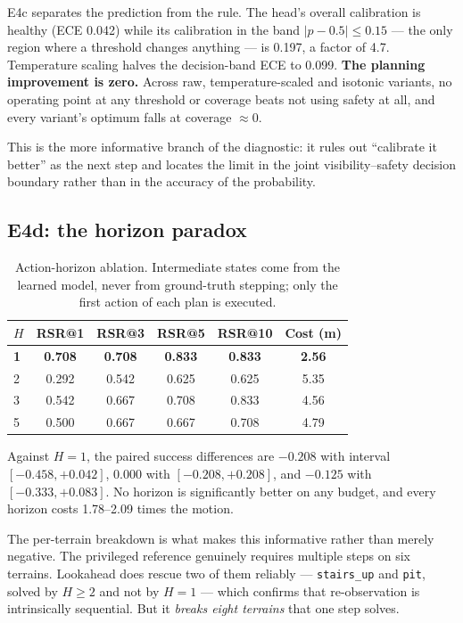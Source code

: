 \documentclass[utf8]{FrontiersinHarvard}
\begin{document}
E4c separates the prediction from the rule. The head's overall calibration is healthy
(ECE 0.042) while its calibration in the band $|p-0.5| \le 0.15$ --- the only region
where a threshold changes anything --- is 0.197, a factor of 4.7. Temperature scaling
halves the decision-band ECE to 0.099. \textbf{The planning improvement is zero.} Across
raw, temperature-scaled and isotonic variants, no operating point at any threshold or
coverage beats not using safety at all, and every variant's optimum falls at coverage
$\approx 0$.

This is the more informative branch of the diagnostic: it rules out ``calibrate it
better'' as the next step and locates the limit in the joint visibility--safety decision
boundary rather than in the accuracy of the probability.

\subsection{E4d: the horizon paradox}

\begin{table}[h]
\caption{Action-horizon ablation. Intermediate states come from the learned model, never
from ground-truth stepping; only the first action of each plan is executed.}
\label{tab:horizon}
\begin{tabular}{lccccc}
\toprule
$H$ & RSR@1 & RSR@3 & RSR@5 & RSR@10 & Cost (m) \\
\midrule
\textbf{1} & \textbf{0.708} & \textbf{0.708} & \textbf{0.833} & \textbf{0.833} & \textbf{2.56} \\
2 & 0.292 & 0.542 & 0.625 & 0.625 & 5.35 \\
3 & 0.542 & 0.667 & 0.708 & 0.833 & 4.56 \\
5 & 0.500 & 0.667 & 0.667 & 0.708 & 4.79 \\
\bottomrule
\end{tabular}
\end{table}

Against $H=1$, the paired success differences are $-0.208$ with interval
$[-0.458, +0.042]$, $0.000$ with $[-0.208, +0.208]$, and $-0.125$ with
$[-0.333, +0.083]$. No horizon is significantly better on any budget, and every
horizon costs 1.78--2.09 times the motion.

The per-terrain breakdown is what makes this informative rather than merely negative.
The privileged reference genuinely requires multiple steps on six terrains. Lookahead
does rescue two of them reliably --- \texttt{stairs\_up} and \texttt{pit}, solved by
$H \ge 2$ and not by $H=1$ --- which confirms that re-observation is intrinsically
sequential. But it \emph{breaks eight terrains} that one step solves.
\end{document}
